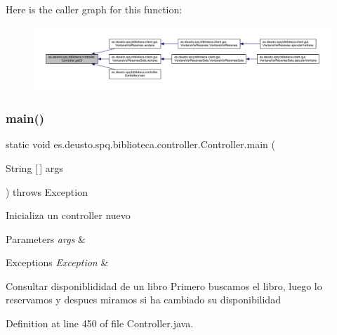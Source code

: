 Here is the caller graph for this function\+:
\nopagebreak
\begin{figure}[H]
\begin{center}
\leavevmode
\includegraphics[width=350pt]{classes_1_1deusto_1_1spq_1_1biblioteca_1_1controller_1_1_controller_a14860df4246cd7cefcc7e9e460d504ce_icgraph}
\end{center}
\end{figure}
\mbox{\label{classes_1_1deusto_1_1spq_1_1biblioteca_1_1controller_1_1_controller_aebc01845557525b0f7326b2ad5c612b2}} 
\subsubsection{\texorpdfstring{main()}{main()}}
{\footnotesize\ttfamily static void es.\+deusto.\+spq.\+biblioteca.\+controller.\+Controller.\+main (\begin{DoxyParamCaption}\item[{String \mbox{[}$\,$\mbox{]}}]{args }\end{DoxyParamCaption}) throws Exception\hspace{0.3cm}{\ttfamily [static]}}

Inicializa un controller nuevo 
\begin{DoxyParams}{Parameters}
{\em args} & \\
\hline
\end{DoxyParams}

\begin{DoxyExceptions}{Exceptions}
{\em Exception} & \\
\hline
\end{DoxyExceptions}
Consultar disponiblididad de un libro Primero buscamos el libro, luego lo reservamos y despues miramos si ha cambiado su disponibilidad

Definition at line 450 of file Controller.\+java.

